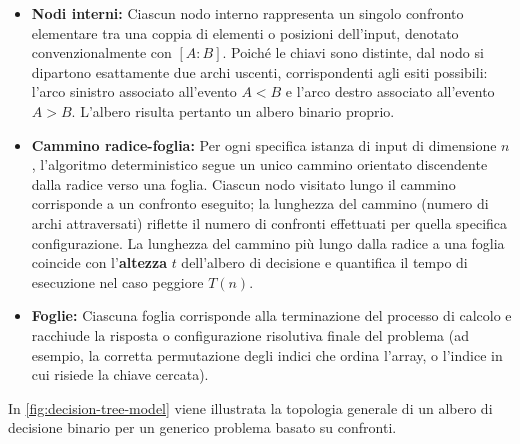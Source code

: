 \begin{itemize}
  \item \textbf{Nodi interni:} Ciascun nodo interno rappresenta un singolo confronto elementare tra una coppia di elementi o posizioni dell'input, denotato convenzionalmente con $[A : B]$. Poiché le chiavi sono distinte, dal nodo si dipartono esattamente due archi uscenti, corrispondenti agli esiti possibili: l'arco sinistro associato all'evento $A < B$ e l'arco destro associato all'evento $A > B$. L'albero risulta pertanto un albero binario proprio.
  \item \textbf{Cammino radice-foglia:} Per ogni specifica istanza di input di dimensione $n$, l'algoritmo deterministico segue un unico cammino orientato discendente dalla radice verso una foglia. Ciascun nodo visitato lungo il cammino corrisponde a un confronto eseguito; la lunghezza del cammino (numero di archi attraversati) riflette il numero di confronti effettuati per quella specifica configurazione. La lunghezza del cammino più lungo dalla radice a una foglia coincide con l'\textbf{altezza} $t$ dell'albero di decisione e quantifica il tempo di esecuzione nel caso peggiore $T(n)$.
  \item \textbf{Foglie:} Ciascuna foglia corrisponde alla terminazione del processo di calcolo e racchiude la risposta o configurazione risolutiva finale del problema (ad esempio, la corretta permutazione degli indici che ordina l'array, o l'indice in cui risiede la chiave cercata).
\end{itemize}

In \autoref{fig:decision-tree-model} viene illustrata la topologia generale di un albero di decisione binario per un generico problema basato su confronti.

